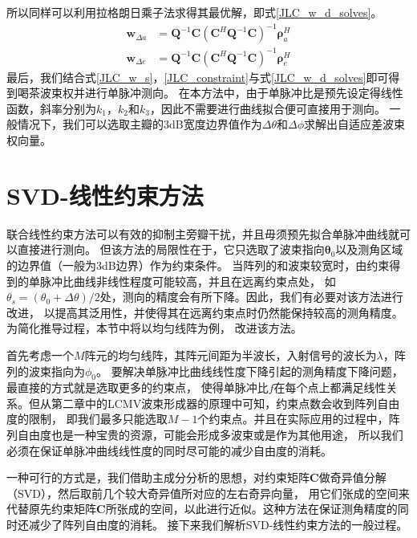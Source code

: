 \documentclass[master]{thesis-uestc}
\begin{document}
所以同样可以利用拉格朗日乘子法求得其最优解，即式\eqref{JLC_w_d_solves}。
\begin{subequations}\label{JLC_w_d_solves}
    \begin{align}
        \bm{w}_{\Delta a} &= \bm{Q}^{-1}\bm{C}\left(\bm{C}^H\bm{Q}^{-1}\bm{C}\right)^{-1}\bm{\rho}^H_a \\
        \bm{w}_{\Delta e} &= \bm{Q}^{-1}\bm{C}\left(\bm{C}^H\bm{Q}^{-1}\bm{C}\right)^{-1}\bm{\rho}^H_e
    \end{align}
\end{subequations}
最后，我们结合式\eqref{JLC_w_s}，\eqref{JLC_constraint}与式\eqref{JLC_w_d_solves}即可得到喝茶波束权并进行单脉冲测向。
在本方法中，由于单脉冲比是预先设定得线性函数，斜率分别为$k_1$，$k_2$和$k_3$，因此不需要进行曲线拟合便可直接用于测向。
一般情况下，我们可以选取主瓣的3dB宽度边界值作为$\Delta\theta$和$\Delta\phi$求解出自适应差波束权向量。

\section{SVD-线性约束方法}
联合线性约束方法可以有效的抑制主旁瓣干扰，并且毋须预先拟合单脉冲曲线就可以直接进行测向。
但该方法的局限性在于，它只选取了波束指向$\bm{\theta}_0$以及测角区域的边界值（一般为3dB边界）作为约束条件。
当阵列的和波束较宽时，由约束得到的单脉冲比曲线非线性程度可能较高，并且在远离约束点处，
如$\theta_s=(\theta_0+\Delta\theta)/2$处，测向的精度会有所下降。因此，我们有必要对该方法进行改进，
以提高其泛用性，并使得其在远离约束点时仍然能保持较高的测角精度。为简化推导过程，本节中将以均匀线阵为例，
改进该方法。

首先考虑一个$M$阵元的均匀线阵，其阵元间距为半波长，入射信号的波长为$\lambda$，阵列的波束指向为$\phi_0$。
要解决单脉冲比曲线线性度下降引起的测角精度下降问题，最直接的方式就是选取更多的约束点，
使得单脉冲比$f$在每个点上都满足线性关系。但从第二章中的LCMV波束形成器的原理中可知，约束点数会收到阵列自由度的限制，
即我们最多只能选取$M-1$个约束点。并且在实际应用的过程中，阵列自由度也是一种宝贵的资源，可能会形成多波束或是作为其他用途，
所以我们必须在保证单脉冲曲线线性度的同时尽可能的减少自由度的消耗。

一种可行的方式是，我们借助主成分分析的思想，对约束矩阵$\bm{C}$做奇异值分解（SVD），然后取前几个较大奇异值所对应的左右奇异向量，
用它们张成的空间来代替原先约束矩阵$\bm{C}$所张成的空间，以此进行近似。这种方法在保证测角精度的同时还减少了阵列自由度的消耗。
接下来我们解析SVD-线性约束方法的一般过程。
\end{document}
